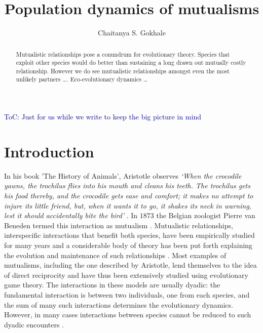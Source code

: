 \documentclass{pnastwo}
\newcommand{\cha}[1]{\textcolor{darkblue}{#1}}
\begin{document}
\title{Population dynamics of mutualisms}

 \author{Chaitanya S. Gokhale}


\maketitle

\begin{article}

\begin{abstract}
Mutualistic relationships pose a conundrum for evolutionary theory.
Species that exploit other species would do better than sustaining a long drawn out mutually costly relationship. However we do see mutualistic relationships amongst even the most unlikely partners \ldots.
Eco-evolutionary dynamics \ldots
\end{abstract}



\tableofcontents

\cha{ToC: Just for us while we write to keep the big picture in mind}

\section{Introduction}

In his book 'The History of Animals', Aristotle observes
{\em
`When the crocodile yawns, the trochilus flies into his mouth and cleans
his teeth. The trochilus gets his food thereby, and the crocodile
gets ease and comfort; it makes no attempt to injure its little friend,
but, when it wants it to go, it shakes its neck in warning, lest it
should accidentally bite the bird'} \cite{aristotle:350bc}.
In $1873$ the Belgian zoologist Pierre van Beneden termed this interaction as mutualism \cite{bronstein:book:2003}.
Mutualistic relationships, interspecific interactions that benefit both species, have been empirically studied for many years 
\cite{boucher:book:1985,hinton:PTENHS:1951,wilson:AmNat:1983,bronstein:QRB:1994,pierce:ARE:2002,kiers:Nature:2003,bshary:ASB:2004} and a considerable body of theory has been put forth explaining the evolution and maintenance of such relationships \cite{poulin:JTB:1995,doebeli:PNAS:1998,noe:book:2001,johnstone:ECL:2002,bergstrom:PNAS:2003,hoeksema:AmNat:2003,akcay:PRSB:2007,bshary:Nature:2008}.
Most examples of mutualisms, including the one described by Aristotle, lend themselves to the idea of direct reciprocity \cite{trivers:QRB:1971} and have thus been extensively studied using evolutionary game theory.
The interactions in these models are usually dyadic: the fundamental interaction is between two individuals, one from each species, and the sum of many such interactions determines the evolutionary dynamics. %
However, in many cases interactions between species cannot be reduced to such dyadic encounters \cite{stadler:book:2008}.


\end{article}
\end{document}
